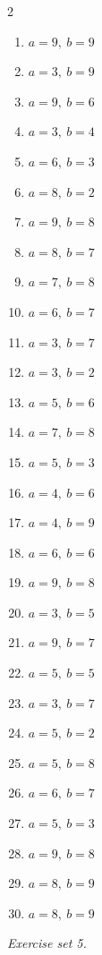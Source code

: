 \begin{multicols}{2}\raggedright
\begin{enumerate}[label=\arabic*., leftmargin=*, itemsep=1pt]
\item $a=9,\ b=9$
\item $a=3,\ b=9$
\item $a=9,\ b=6$
\item $a=3,\ b=4$
\item $a=6,\ b=3$
\item $a=8,\ b=2$
\item $a=9,\ b=8$
\item $a=8,\ b=7$
\item $a=7,\ b=8$
\item $a=6,\ b=7$
\item $a=3,\ b=7$
\item $a=3,\ b=2$
\item $a=5,\ b=6$
\item $a=7,\ b=8$
\item $a=5,\ b=3$
\item $a=4,\ b=6$
\item $a=4,\ b=9$
\item $a=6,\ b=6$
\item $a=9,\ b=8$
\item $a=3,\ b=5$
\item $a=9,\ b=7$
\item $a=5,\ b=5$
\item $a=3,\ b=7$
\item $a=5,\ b=2$
\item $a=5,\ b=8$
\item $a=6,\ b=7$
\item $a=5,\ b=3$
\item $a=9,\ b=8$
\item $a=8,\ b=9$
\item $a=8,\ b=9$
\end{enumerate}
\end{multicols}
\par\noindent\emph{Exercise set 5.}\nopagebreak
